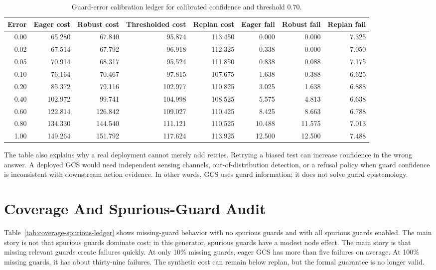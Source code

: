 \documentclass{article}
\begin{document}
\begin{table}[p]
\centering
\caption{Guard-error calibration ledger for calibrated confidence and threshold 0.70.}
\label{tab:error-ledger}
\scriptsize
\begin{tabular}{rrrrrrrr}
\toprule
Error & Eager cost & Robust cost & Thresholded cost & Replan cost & Eager fail & Robust fail & Replan fail\\
\midrule
0.00 & 65.280 & 67.840 & 95.874 & 113.450 & 0.000 & 0.000 & 7.325\\
0.02 & 67.514 & 67.792 & 96.918 & 112.325 & 0.338 & 0.000 & 7.050\\
0.05 & 70.914 & 68.317 & 95.524 & 111.850 & 0.838 & 0.088 & 7.175\\
0.10 & 76.164 & 70.467 & 97.815 & 107.675 & 1.638 & 0.388 & 6.625\\
0.20 & 85.372 & 79.116 & 102.977 & 110.825 & 3.025 & 1.638 & 6.888\\
0.40 & 102.972 & 99.741 & 104.998 & 108.525 & 5.575 & 4.813 & 6.638\\
0.60 & 122.814 & 126.842 & 109.027 & 110.425 & 8.425 & 8.663 & 6.788\\
0.80 & 134.330 & 144.540 & 111.121 & 110.525 & 10.488 & 11.575 & 7.013\\
1.00 & 149.264 & 151.792 & 117.624 & 113.925 & 12.500 & 12.500 & 7.488\\
\bottomrule
\end{tabular}
\end{table}

The table also explains why a real deployment cannot merely add retries. Retrying a biased test can increase confidence in the wrong answer. A deployed GCS would need independent sensing channels, out-of-distribution detection, or a refusal policy when guard confidence is inconsistent with downstream action evidence. In other words, GCS uses guard information; it does not solve guard epistemology.

\section{Coverage And Spurious-Guard Audit}
Table~\ref{tab:coverage-spurious-ledger} shows missing-guard behavior with no spurious guards and with all spurious guards enabled. The main story is not that spurious guards dominate cost; in this generator, spurious guards have a modest node effect. The main story is that missing relevant guards create failures quickly. At only 10\% missing guards, eager GCS has more than five failures on average. At 100\% missing guards, it has about thirty-nine failures. The synthetic cost can remain below replan, but the formal guarantee is no longer valid.
\end{document}
